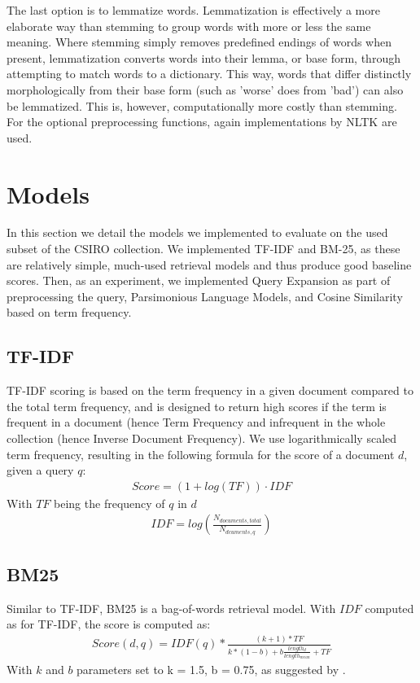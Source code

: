 \documentclass{article}
\begin{document}
The last option is to lemmatize words. Lemmatization is effectively a more elaborate way than stemming to group words with more or less the same meaning. Where stemming simply removes predefined endings of words when present, lemmatization converts words into their lemma, or base form, through attempting to match words to a dictionary. This way, words that differ distinctly morphologically from their base form (such as 'worse' does from 'bad') can also be lemmatized. This is, however, computationally more costly than stemming. For the optional preprocessing functions, again implementations by NLTK are used.

\section*{Models}
In this section we detail the models we implemented to evaluate on the used subset of the CSIRO collection. We implemented TF-IDF and BM-25, as these are relatively simple, much-used retrieval models and thus produce good baseline scores. Then, as an experiment, we implemented Query Expansion as part of preprocessing the query, Parsimonious Language Models, and Cosine Similarity based on term frequency.
\subsection*{TF-IDF}
TF-IDF scoring is based on the term frequency in a given document compared to the total term frequency, and is designed to return high scores if the term is frequent in a document (hence Term Frequency and infrequent in the whole collection (hence Inverse Document Frequency). We use logarithmically scaled term frequency, resulting in the following formula for the score of a document $d$, given a query $q$:
\begin{align*}
Score = (1+log(TF))\cdot IDF
\end{align*}
With $TF$ being the frequency of $q$ in $d$
\begin{align*}
IDF = log(\frac{N_{documents, total}}{N_{dcuments, q}})
\end{align*}
\subsection*{BM25}
Similar to TF-IDF, BM25 is a bag-of-words retrieval model. With $IDF$ computed as for TF-IDF, the score is computed as:
\begin{align*}
Score(d,q) = IDF(q) * \frac{(k+1)*TF}{k*(1-b)+b\frac{length_d}{length_{mean}}+TF}
\end{align*}
With $k$ and $b$ parameters set to k = 1.5, b = 0.75, as suggested by \cite{robertson1995okapi}.
\end{document}
